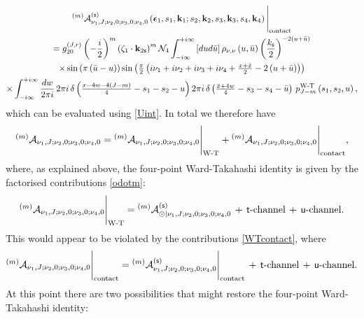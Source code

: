 \documentclass[11pt,a4paper]{article}
\begin{document}
\begin{multline}\label{WTcontact}
     {}^{\left(m\right)}{\cal A}^{\left({\sf s}\right)}_{\nu_1,J;\nu_2,0;\nu_3,0;\nu_4,0}\left(\boldsymbol{\epsilon}_1,s_1,{\bf k}_1;s_2,{\bf k}_2,s_3,{\bf k}_3,s_4,{\bf k}_4\right)\Bigg|_{\text{contact}}\\= g^{\left(J,r\right)}_{20}\left(-\frac{i}{2}\right)^m \left(\zeta_1 \cdot {\bf k}_{2{\sf s}}\right)^m{\cal N}_4 \int^{+i\infty}_{-i\infty}\left[du d{\bar u}\right] \rho_{\nu,\nu}\left(u,{\bar u}\right)\left(\frac{k_{\sf s}}{2}\right)^{-2\left(u+{\bar u}\right)} \\ \times  \sin \left(\pi \left({\bar u}-u\right)\right)\sin \left(\tfrac{\pi}{2}  \left(i \nu_1+i \nu_2+i \nu_3+i \nu_4+\tfrac{x+{\bar x}}{2}-2\left(u+{\bar u}\right)\right)\right)\\ \times \int_{-i\infty}^{+i\infty}\frac{dw}{2\pi i}\, 2\pi i\, \delta\left(\tfrac{x-4w-4\left(J-m\right)}{4}-s_1-s_2-u\right) 2\pi i\, \delta\left(\tfrac{{\bar x}+4w}{4}-s_3-s_4-{\bar u}\right) \,p^{\text{W-T}}_{J-m}\left(s_1,s_2,u\right),
\end{multline}
which can be evaluated using \eqref{Uint}. In total we therefore have
\begin{equation}
     {}^{\left(m\right)}{\cal A}_{\nu_1,J;\nu_2,0;\nu_3,0;\nu_4,0} = {}^{\left(m\right)}{\cal A}_{\nu_1,J;\nu_2,0;\nu_3,0;\nu_4,0}\Bigg|_{\text{W-T}}+{}^{\left(m\right)}{\cal A}_{\nu_1,J;\nu_2,0;\nu_3,0;\nu_4,0}\Bigg|_{\text{contact}},
\end{equation}
where, as explained above, the four-point Ward-Takahashi identity is given by the factorised contributions \eqref{odotm}:
\begin{align}
    {}^{\left(m\right)}{\cal A}_{\nu_1,J;\nu_2,0;\nu_3,0;\nu_4,0}\Bigg|_{\text{W-T}} = {}^{\left(m\right)}{\cal A}^{\left({\sf s}\right)}_{\odot|\nu_1,J;\nu_2,0;\nu_3,0;\nu_4,0}\,+\,{\sf t}\text{-channel}\,+\,{\sf u}\text{-channel}.
\end{align}
This would appear to be violated by the contributions \eqref{WTcontact}, where
\begin{equation}
    {}^{\left(m\right)}{\cal A}_{\nu_1,J;\nu_2,0;\nu_3,0;\nu_4,0}\Bigg|_{\text{contact}}={}^{\left(m\right)}{\cal A}^{\left({\sf s}\right)}_{\nu_1,J;\nu_2,0;\nu_3,0;\nu_4,0}\Bigg|_{\text{contact}}\,+\,{\sf t}\text{-channel}\,+\,{\sf u}\text{-channel}.
\end{equation}
At this point there are two possibilities that might restore the four-point Ward-Takahashi identity:
\end{document}
